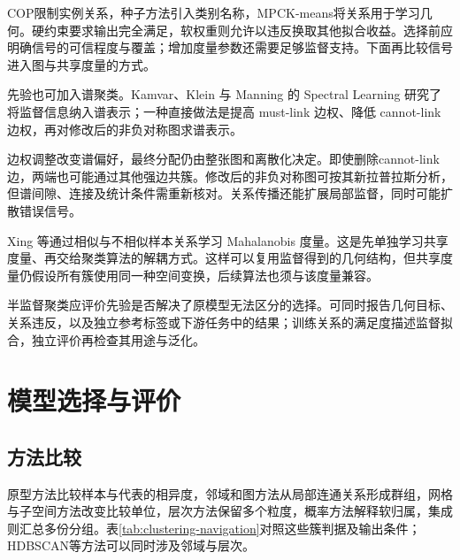 COP限制实例关系，种子方法引入类别名称，MPCK-means将关系用于学习几何。硬约束要求输出完全满足，软权重则允许以违反换取其他拟合收益。选择前应明确信号的可信程度与覆盖；增加度量参数还需要足够监督支持。下面再比较信号进入图与共享度量的方式。

先验也可加入谱聚类。Kamvar、Klein 与 Manning 的 Spectral Learning 研究了将监督信息纳入谱表示；一种直接做法是提高 must-link 边权、降低 cannot-link 边权，再对修改后的非负对称图求谱表示。

边权调整改变谱偏好，最终分配仍由整张图和离散化决定。即使删除cannot-link边，两端也可能通过其他强边共簇。修改后的非负对称图可按其新拉普拉斯分析，但谱间隙、连接及统计条件需重新核对。关系传播还能扩展局部监督，同时可能扩散错误信号。

Xing 等通过相似与不相似样本关系学习 Mahalanobis 度量。这是先单独学习共享度量、再交给聚类算法的解耦方式。这样可以复用监督得到的几何结构，但共享度量仍假设所有簇使用同一种空间变换，后续算法也须与该度量兼容。

半监督聚类应评价先验是否解决了原模型无法区分的选择。可同时报告几何目标、关系违反，以及独立参考标签或下游任务中的结果；训练关系的满足度描述监督拟合，独立评价再检查其用途与泛化。

\section{模型选择与评价}
\label{sec:clustering-evaluation}

\subsection{方法比较}

原型方法比较样本与代表的相异度，邻域和图方法从局部连通关系形成群组，网格与子空间方法改变比较单位，层次方法保留多个粒度，概率方法解释软归属，集成则汇总多份分组。表\ref{tab:clustering-navigation}对照这些簇判据及输出条件；HDBSCAN等方法可以同时涉及邻域与层次。

